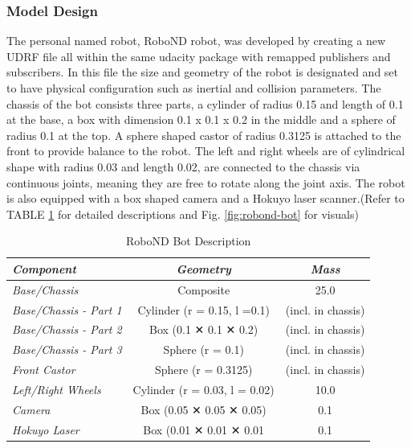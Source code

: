 \documentclass[10pt,journal,compsoc]{IEEEtran}
\begin{document}
\subsubsection{Model Design}
The personal named robot, RoboND robot, was developed by creating a new UDRF file all within the same udacity package with remapped publishers and subscribers. In this file the size and geometry of the robot is designated and set to have physical configuration such as inertial and collision parameters. The chassis of the bot consists three parts, a cylinder of radius 0.15 and length of 0.1 at the base, a box with dimension 0.1 x 0.1 x 0.2 in the middle and a sphere of radius 0.1 at the top. A sphere shaped castor of radius 0.3125 is attached to the front to provide balance to the robot. The left and right wheels are of cylindrical shape with radius 0.03 and length 0.02, are connected to the chassis via continuous joints, meaning they are free to rotate along the joint axis. The robot is also equipped with a box shaped camera and a Hokuyo laser scanner.(Refer to TABLE \ref{table:desc-robond-bot} for detailed descriptions and Fig. \ref{fig:robond-bot} for visuals)

\begin{table}[h]
\renewcommand{\arraystretch}{1.5}
\centering
\begin{tabular}{|l|c|c|}
\hline
\textit{\textbf{Component}}    & \textit{\textbf{Geometry}}    & \textit{\textbf{Mass}}                  \\ \hline
\textit{Base/Chassis}          & Composite                     & 25.0                                    \\ \hline
\textit{Base/Chassis - Part 1} & Cylinder (r = 0.15, l =0.1)   & \multicolumn{1}{l|}{(incl. in chassis)} \\ \hline
\textit{Base/Chassis - Part 2} & Box (0.1 ✕ 0.1 ✕ 0.2)         & \multicolumn{1}{l|}{(incl. in chassis)} \\ \hline
\textit{Base/Chassis - Part 3} & Sphere (r = 0.1)              & \multicolumn{1}{l|}{(incl. in chassis)} \\ \hline
\textit{Front Castor}          & Sphere (r = 0.3125)           & (incl. in chassis)                      \\ \hline
\textit{Left/Right  Wheels}    & Cylinder (r = 0.03, l = 0.02) & 10.0                                    \\ \hline
\textit{Camera}                & Box (0.05 ✕ 0.05 ✕ 0.05)      & 0.1                                     \\ \hline
\textit{Hokuyo Laser}          & Box (0.01 ✕ 0.01 ✕ 0.01       & 0.1                                     \\ \hline
\end{tabular}
\vspace{5pt}
\caption{RoboND Bot Description}
\label{table:desc-robond-bot}
\end{table}
\end{document}
